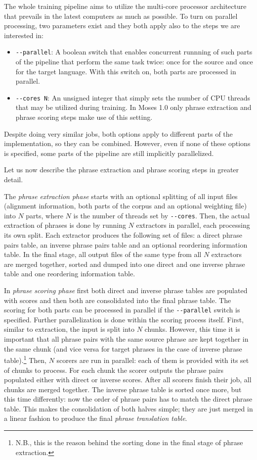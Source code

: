The whole training pipeline aims to utilize the multi-core processor architecture that
prevails in the latest computers as much as possible. To turn on parallel processing,
two parameters exist and they both apply also to the steps we are interested in:
\begin{itemize}
  \item \verb|--parallel|: A boolean switch that enables concurrent runnning of such parts of
  the pipeline that perform the same task twice: once for the source and once for the target language.
  With this switch on, both parts are processed in parallel.
  \item \verb|--cores N|: An unsigned integer that simply sets the number of CPU threads
  that may be utilized during training. In Moses 1.0 only phrase extraction and phrase
  scoring steps make use of this setting.
\end{itemize}
Despite doing very similar jobs, both options apply to different parts
of the implementation, so they can be combined.
However, even if none of these options is specified, some parts of the pipeline
are still implicitly parallelized.

Let us now describe the phrase extraction and phrase scoring steps in greater detail.

The \emph{phrase extraction phase} starts with an optional splitting of all input files
(alignment information, both parts of the corpus and an optional weighting file) into $N$
parts, where $N$ is the number of threads set by \verb|--cores|.
Then, the actual extraction of phrases is done by running $N$ extractors in parallel,
each processing its own split.
Each extractor produces the following set of files: a direct phrase pairs table, an inverse
phrase pairs table and an optional reordering information table.
In the final stage, all output files of the same type from all $N$ extractors are
merged together, sorted and dumped into one direct and one inverse phrase table
and one reordering information table.

In \emph{phrase scoring phase} first both direct and inverse phrase tables are
populated with scores and then both are consolidated into the final phrase table.
The scoring for both parts can be processed in parallel if the \verb|--parallel|
switch is specified.
Further parallelization is done within the scoring process itself.
First, similar to extraction, the input is split into $N$ chunks.
However, this time it is important that all phrase pairs with the same source
phrase are kept together in the same chunk (and vice versa for target phrases
in the case of inverse phrase table).\footnote{N.B., this is the reason behind
the sorting done in the final stage of phrase extraction.}
Then, $N$ scorers are run in parallel: each of them is provided with its set
of chunks to process.
For each chunk the scorer outputs the phrase pairs populated either with direct
or inverse scores.
After all scorers finish their job, all chunks are merged together.
The inverse phrase table is sorted once more, but this time differently:
now the order of phrase pairs has to match the direct phrase table.
This makes the consolidation of both halves simple; they are just merged
in a linear fashion to produce the final \emph{phrase translation table}.

